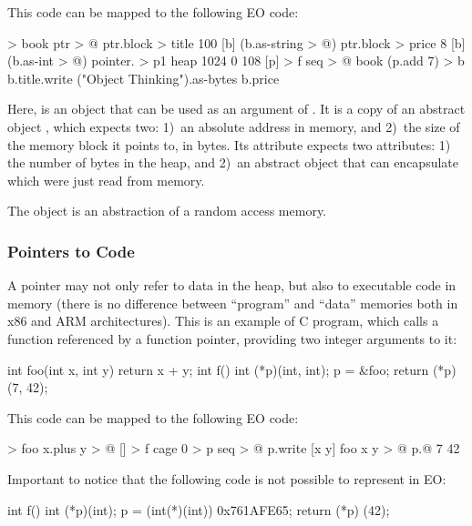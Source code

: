 \documentclass[sigplan,11pt,nonacm,natbib=false]{acmart}
\begin{document}
This code can be mapped to the following EO code:

\begin{ffcode}
[ptr] > book
  ptr > @
  ptr.block > title
    100
    [b] (b.as-string > @)
  ptr.block > price
    8
    [b] (b.as-int > @)
pointer. > p1
  heap 1024
  0
  108
[p] > f
  seq > @
    book (p.add 7) > b
    b.title.write
      ("Object Thinking").as-bytes
    b.price    
\end{ffcode}

Here,  is an object that can be used as an argument of . It is a copy of an abstract object , which expects two: 1)~an absolute address in memory, and 2)~the size of the memory block it points to, in bytes. Its attribute  expects two attributes: 1) the number of bytes in the heap, and 2)~an abstract object that can encapsulate  which were just read from memory.

The object  is an abstraction of a random access memory.

\subsubsection{Pointers to Code}

A pointer may not only refer to data in the heap, but also to executable code in memory (there is no difference between ``program'' and ``data'' memories both in x86 and ARM architectures). This is an example of C program, which calls a function referenced by a function pointer, providing two integer arguments to it:

\begin{ffcode}
int foo(int x, int y) {
  return x + y;
}
int f() {
  int (*p)(int, int);
  p = &foo;
  return (*p) (7, 42);
}
\end{ffcode}

This code can be mapped to the following EO code:

\begin{ffcode}
[x y] > foo
  x.plus y > @
[] > f
  cage 0 > p
  seq > @
    p.write
      [x y]
        foo x y > @
    p.@ 7 42
\end{ffcode}

Important to notice that the following code is not possible to represent in EO:

\begin{ffcode}
int f() {
  int (*p)(int);
  p = (int(*)(int)) 0x761AFE65;
  return (*p) (42);
}
\end{ffcode}
\end{document}
